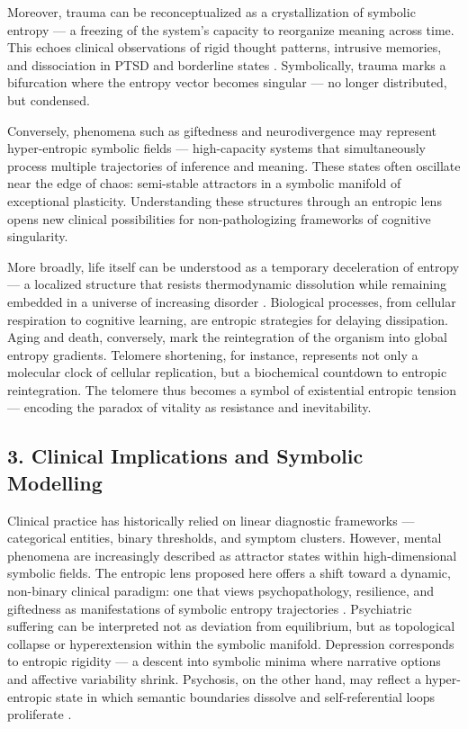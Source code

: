 Moreover, trauma can be reconceptualized as a crystallization of symbolic entropy — a freezing of the system’s capacity to reorganize meaning across time. This echoes clinical observations of rigid thought patterns, intrusive memories, and dissociation in PTSD and borderline states \cite{van2014body}. Symbolically, trauma marks a bifurcation where the entropy vector becomes singular — no longer distributed, but condensed.

Conversely, phenomena such as giftedness and neurodivergence may represent hyper-entropic symbolic fields — high-capacity systems that simultaneously process multiple trajectories of inference and meaning. These states often oscillate near the edge of chaos: semi-stable attractors in a symbolic manifold of exceptional plasticity. Understanding these structures through an entropic lens opens new clinical possibilities for non-pathologizing frameworks of cognitive singularity.

More broadly, life itself can be understood as a temporary deceleration of entropy — a localized structure that resists thermodynamic dissolution while remaining embedded in a universe of increasing disorder \cite{blackburn2015telomeres}. Biological processes, from cellular respiration to cognitive learning, are entropic strategies for delaying dissipation. Aging and death, conversely, mark the reintegration of the organism into global entropy gradients. Telomere shortening, for instance, represents not only a molecular clock of cellular replication, but a biochemical countdown to entropic reintegration. The telomere thus becomes a symbol of existential entropic tension — encoding the paradox of vitality as resistance and inevitability.

\subsection*{3. Clinical Implications and Symbolic Modelling}

Clinical practice has historically relied on linear diagnostic frameworks — categorical entities, binary thresholds, and symptom clusters. However, mental phenomena are increasingly described as attractor states within high-dimensional symbolic fields. The entropic lens proposed here offers a shift toward a dynamic, non-binary clinical paradigm: one that views psychopathology, resilience, and giftedness as manifestations of symbolic entropy trajectories \cite{bzdok2016network}. Psychiatric suffering can be interpreted not as deviation from equilibrium, but as topological collapse or hyperextension within the symbolic manifold. Depression corresponds to entropic rigidity — a descent into symbolic minima where narrative options and affective variability shrink. Psychosis, on the other hand, may reflect a hyper-entropic state in which semantic boundaries dissolve and self-referential loops proliferate \cite{carhart2014, luhrmann2020voices}.

